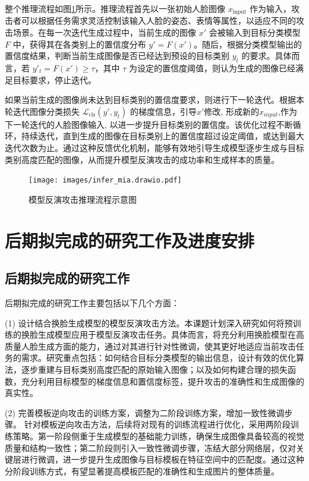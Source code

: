 整个推理流程如图\ref{fig:edm_mia_infer}所示。推理流程首先以一张初始人脸图像 $x_{\text{input}}$ 作为输入，攻击者可以根据任务需求灵活控制该输入人脸的姿态、表情等属性，以适应不同的攻击场景。在每一次迭代生成过程中，当前生成的图像 $x'$ 会被输入到目标分类模型 $F$ 中，获得其在各类别上的置信度分布 $y' = F(x')$。随后，根据分类模型输出的置信度结果，判断当前生成图像是否已经达到预设的目标类别 $y_t$ 的要求。具体而言，若 $y'_t = F(x') \geq \tau$，其中 $\tau$ 为设定的置信度阈值，则认为生成的图像已经满足目标要求，停止迭代。

如果当前生成的图像尚未达到目标类别的置信度要求，则进行下一轮迭代。根据本轮迭代图像分类损失 $\mathcal{L}_{\text{cls}}(y', y_t)$ 的梯度信息，引导$x'$修改, 形成新的$x_{input}$,作为下一轮迭代的人脸图像输入, 以进一步提升目标类别的置信度。该优化过程不断循环，持续迭代，直到生成的图像在目标类别上的置信度超过设定阈值，或达到最大迭代次数为止。通过这种反馈优化机制，能够有效地引导生成模型逐步生成与目标类别高度匹配的图像，从而提升模型反演攻击的成功率和生成样本的质量。

\begin{figure}[!htbp]
  \centering
  \texttt{[image: images/infer\_mia.drawio.pdf]}
  \caption{模型反演攻击推理流程示意图}
  \label{fig:edm_mia_infer}
\end{figure}

\section{后期拟完成的研究工作及进度安排}
\subsection{后期拟完成的研究工作}

后期拟完成的研究工作主要包括以下几个方面：

(1) 设计结合换脸生成模型的模型反演攻击方法。本课题计划深入研究如何将预训练的换脸生成模型应用于模型反演攻击任务。具体而言，将充分利用换脸模型在高质量人脸生成方面的能力，通过对其进行针对性微调，使其更好地适应当前攻击任务的需求。研究重点包括：如何结合目标分类模型的输出信息，设计有效的优化算法，逐步重建与目标类别高度匹配的原始输入图像；以及如何构建合理的损失函数，充分利用目标模型的梯度信息和置信度标签，提升攻击的准确性和生成图像的真实性。

(2) 完善模板逆向攻击的训练方案，调整为二阶段训练方案，增加一致性微调步骤。  针对模板逆向攻击方法，后续将对现有的训练流程进行优化，采用两阶段训练策略。第一阶段侧重于生成模型的基础能力训练，确保生成图像具备较高的视觉质量和结构一致性；第二阶段则引入一致性微调步骤，冻结大部分网络层，仅对关键层进行微调，进一步提升生成图像与目标模板在特征空间中的匹配度。通过这种分阶段训练方式，有望显著提高模板匹配的准确性和生成图片的整体质量。


